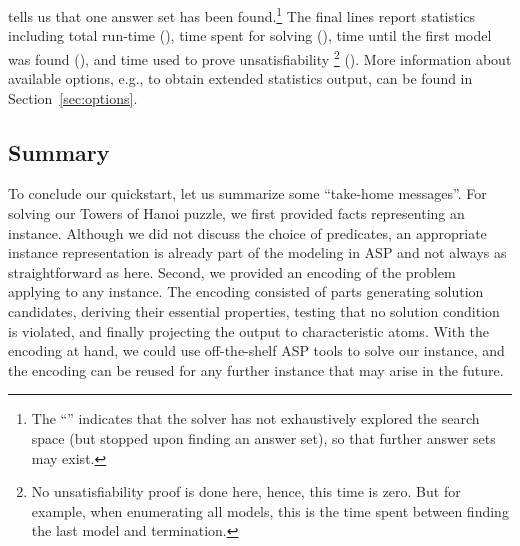 tells us that one answer set has been found.\footnote{%
The ``\code{+}'' indicates that 
the solver has not exhaustively explored the search space
(but stopped upon finding an answer set),
so that further answer sets may exist.}
The final lines report statistics including
total run-time (),
time spent for solving (),
time until the first model was found (), and
time used to prove unsatisfiability%
\footnote{
No unsatisfiability proof is done here, hence, this time is zero.
But for example, when enumerating all models, this is the time spent between finding the last model and termination.
} ().
More information about available options, e.g.,
to obtain extended statistics output,
can be found in Section~\ref{sec:options}.

\subsection{Summary}

To conclude our quickstart, let us summarize some ``take-home messages''.
For solving our Towers of Hanoi puzzle, we first provided facts representing an instance.
Although we did not discuss the choice of predicates, an
appropriate instance representation is already part of the modeling in ASP and
not always as straightforward as here.
Second, we provided an encoding of the problem applying to any instance.
The encoding consisted of parts generating solution candidates,
deriving their essential properties,
testing that no solution condition is violated,
and finally projecting the output to characteristic atoms.
With the encoding at hand, we could use off-the-shelf ASP tools to solve our instance,
and the encoding can be reused for any further
instance that may arise in the future.

